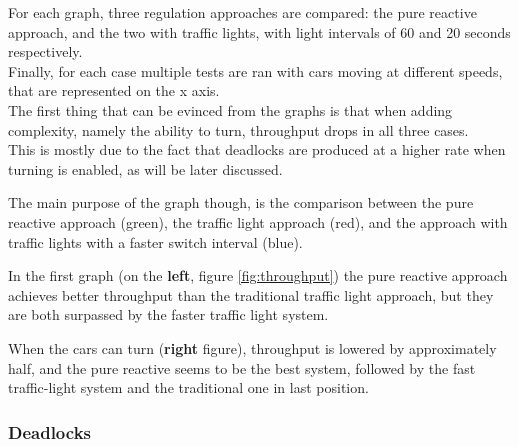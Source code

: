 
For each graph, three regulation approaches are compared: the pure reactive approach, and the two with traffic lights, with light intervals of 60 and 20 seconds respectively.\\
Finally, for each case multiple tests are ran with cars moving at different speeds, that are represented on the x axis.\\

The first thing that can be evinced from the graphs is that when adding complexity, namely the ability to turn, throughput drops in all three cases.\\
This is mostly due to the fact that deadlocks are produced at a higher rate when turning is enabled, as will be later discussed.

The main purpose of the graph though, is the comparison between the pure reactive approach (green), the traffic light approach (red), and the approach with traffic lights with a faster switch interval (blue).

In the first graph (on the \textbf{left}, figure \ref{fig:throughput}) the pure reactive approach achieves better throughput than the traditional traffic light approach, but they are both surpassed by the faster traffic light system.

When the cars can turn (\textbf{right} figure), throughput is lowered by approximately half, and the pure reactive seems to be the best system, followed by the fast traffic-light system and the traditional one in last position.

\subsubsection{Deadlocks}

